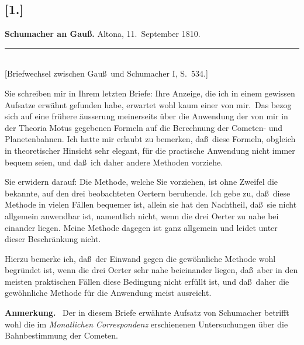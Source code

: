 \documentclass[12pt,a4paper]{article}
\theoremstyle{plain}
\theoremstyle{definition}
\theoremstyle{remark}
\begin{document}
\subsection*{[1.]}
\begin{center}
\textbf{Schumacher an Gau\ss.} Altona, 11.~September 1810.
\end{center}
\begin{center}
\rule{6cm}{0.4pt}\\[4pt]
[Briefwechsel zwischen Gau\ss\ und Schumacher I, S.~534.]
\end{center}

Sie schreiben mir in Ihrem letzten Briefe: \glqq Ihre Anzeige,
die ich in einem gewissen Aufsatze erw\"ahnt gefunden habe, erwartet
wohl kaum einer von mir.\grqq\ Das bezog sich auf eine fr\"uhere
\"ausserung meinerseits \"uber die Anwendung der von mir in der
{Theoria Motus} gegebenen Formeln auf die Berechnung der Cometen- und
Planetenbahnen. Ich hatte mir erlaubt zu bemerken, da\ss\ diese
Formeln, obgleich in theoretischer Hinsicht sehr elegant, f\"ur die
practische Anwendung nicht immer bequem seien, und da\ss\ ich daher
andere Methoden vorziehe.

Sie erwidern darauf: \glqq Die Methode, welche Sie vorziehen, ist
ohne Zweifel die bekannte, auf den drei beobachteten Oertern
beruhende. Ich gebe zu, da\ss\ diese Methode in vielen F\"allen
bequemer ist, allein sie hat den Nachtheil, da\ss\ sie nicht allgemein
anwendbar ist, namentlich nicht, wenn die drei Oerter zu nahe bei
einander liegen. Meine Methode dagegen ist ganz allgemein und
leidet unter dieser Beschr\"ankung nicht.\grqq

Hierzu bemerke ich, da\ss\ der Einwand gegen die gew\"ohnliche Methode
wohl begr\"undet ist, wenn die drei Oerter sehr nahe beieinander
liegen, da\ss\ aber in den meisten praktischen F\"allen diese
Bedingung nicht erf\"ullt ist, und da\ss\ daher die gew\"ohnliche
Methode f\"ur die Anwendung meist ausreicht.

\medskip

\textbf{Anmerkung.} \ Der in diesem Briefe erw\"ahnte Aufsatz von
{\sc Schumacher} betrifft wohl die im \textit{Monatlichen
Correspondenz} erschienenen Untersuchungen \"uber die
Bahnbestimmung der Cometen.


\end{document}
